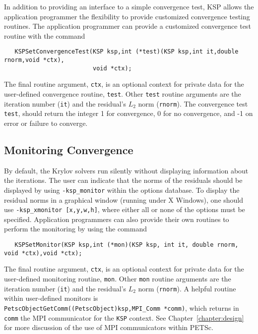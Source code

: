 In addition to providing an interface to a simple convergence test,
KSP allows the application programmer the flexibility to provide 
customized convergence testing routines.  
The application programmer can provide a customized convergence test 
routine with the command 
\begin{verbatim}
   KSPSetConvergenceTest(KSP ksp,int (*test)(KSP ksp,int it,double rnorm,void *ctx),
                         void *ctx);
\end{verbatim}
The final routine argument, {\tt ctx}, is an optional context for private
data for the user-defined convergence routine, {\tt test}.  Other
{\tt test} routine arguments are the iteration
number ({\tt it}) and the residual's $L_2$ norm ({\tt rnorm}).
The convergence test {\tt test}, should return the 
integer 1 for convergence, 0 for no convergence, and -1 on error or 
failure to converge.  
 
\subsection{Monitoring Convergence}

By default, the Krylov solvers run silently without displaying information 
about the iterations. The user can indicate that the norms of the residuals 
should be displayed by using 
{\tt -ksp\_monitor} within the options database.  
To display the residual norms in a graphical window (running under X Windows),
one should use {\tt -ksp\_xmonitor [x,y,w,h]}, where either all or none of 
the options must be specified. 
Application programmers can also provide their own routines to perform 
the monitoring by using the command 
\begin{verbatim}
   KSPSetMonitor(KSP ksp,int (*mon)(KSP ksp, int it, double rnorm, void *ctx),void *ctx);
\end{verbatim}
The final routine argument, {\tt ctx}, is an optional context for private
data for the user-defined monitoring routine, {\tt mon}.  Other
{\tt mon} routine arguments are the iteration
number ({\tt it}) and the residual's $L_2$ norm ({\tt rnorm}).
A helpful routine within user-defined monitors is 
{\tt PetscObjectGetComm((PetscObject)ksp,MPI\_Comm *comm)}, which returns
in {\tt comm}   the
MPI communicator for the {\tt KSP} context.  See Chapter~\ref{chapter:design}
for more discussion of the use of MPI communicators within PETSc.


